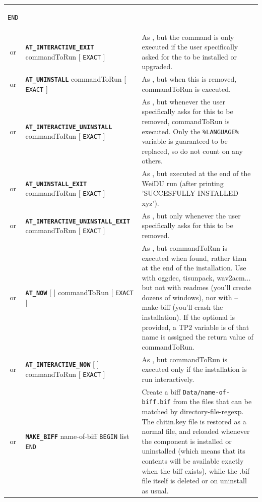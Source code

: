 \documentclass{article}
\def\ttref#1{\ahrefloc{#1}{\tt #1}}
\def\DEFINE#1{{\tt \bf #1}\label{#1}\index{#1}}
\def\t#1{{\tt #1}}
\def\Slist{{\color{red} list }}
\def\Ob{{\color{red} [ }}
\def\Oe{{\color{red} ] }}
\begin{document}
\begin{tabular}{cp{10in}|p{10in}}
\begin{verbatim}
END
\end{verbatim}
    \\
  or & \DEFINE{AT_INTERACTIVE_EXIT} commandToRun \Ob \t{EXACT} \Oe &
    As \ttref{AT_EXIT}, but the command is only executed if the user
    specifically asked for the \ttref{component} to be installed or
    upgraded. \\
  or & \DEFINE{AT_UNINSTALL} commandToRun \Ob \t{EXACT} \Oe &
    As \ttref{AT_EXIT}, but when this \ttref{component} is removed,
    commandToRun is executed.\\
  or & \DEFINE{AT_INTERACTIVE_UNINSTALL} commandToRun \Ob \t{EXACT} \Oe &
    As \ttref{AT_EXIT}, but whenever the user specifically asks for this
    \ttref{component} to be removed, commandToRun is executed.
    Only the \t{\%LANGUAGE\%} variable is guaranteed to be
    replaced, so do not count on any others. \\
  or & \DEFINE{AT_UNINSTALL_EXIT} commandToRun \Ob \t{EXACT} \Oe &
    As \ttref{AT_UNINSTALL}, but executed at the end of the WeiDU run (after
	printing 'SUCCESFULLY INSTALLED xyz').\\
  or & \DEFINE{AT_INTERACTIVE_UNINSTALL_EXIT} commandToRun \Ob \t{EXACT} \Oe &
    As \ttref{AT_UNINSTALL_EXIT}, but only whenever the user specifically asks for this
    \ttref{component} to be removed. \\
  or & \DEFINE{AT_NOW} \Ob \ttref{variable} \Oe commandToRun \Ob \t{EXACT} \Oe &
    As \ttref{AT_EXIT}, but commandToRun is executed when found,
    rather than at the end of the installation. Use with oggdec,
    tisunpack, wav2acm...  but not with readmes (you'll create dozens
    of windows), nor with --make-biff (you'll crash the
    installation). If the optional \ttref{variable} is provided, a TP2
    variable is of that name is assigned the return value of
    commandToRun. \\
  or & \DEFINE{AT_INTERACTIVE_NOW} \Ob \ttref{variable} \Oe commandToRun \Ob \t{EXACT} \Oe &
    As \ttref{AT_NOW}, but commandToRun is executed only if the installation is
    run interactively.\\
  or & \DEFINE{MAKE_BIFF} name-of-biff \t{BEGIN} \ttref{directory-file-regexp} \Slist \t{END} &
    Create a biff \t{Data/name-of-biff.bif} from the files that can be matched by
    directory-file-regexp. The chitin.key file is restored as a normal file, and
    reloaded whenever the component is installed or uninstalled (which means that its
    contents will be available exactly when the biff exists), while the .bif file
    itself is deleted or on uninstall as usual.  \\

\end{tabular}
\end{document}

